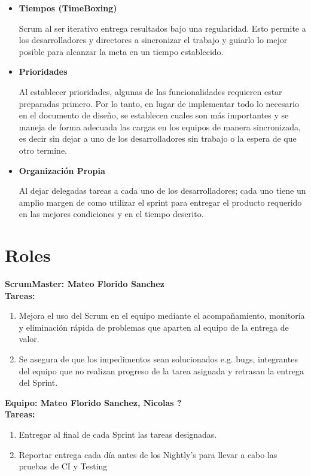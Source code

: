 \documentclass[letterpaper]{scrreprt}
\begin{document}
\begin{itemize}

	\item \textbf{Tiempos (TimeBoxing)}

	 Scrum al ser iterativo entrega resultados bajo una regularidad. Esto permite a los desarrolladores y directores a sincronizar el trabajo y guiarlo lo mejor posible para alcanzar la meta en un tiempo establecido.

	\item \textbf{Prioridades}

	Al establecer prioridades, algunas de las funcionalidades requieren estar preparadas primero. Por lo tanto, en lugar de implementar todo lo necesario en el documento de diseño, se establecen cuales son más importantes y se maneja de forma adecuada las cargas en los equipos de manera sincronizada, es decir sin dejar a uno de los desarrolladores sin trabajo o la espera de que otro termine.

	\item \textbf{Organización Propia}

	Al dejar delegadas tareas a cada uno de los desarrolladores; cada uno tiene un amplio margen de como utilizar el sprint para entregar el producto requerido en las mejores condiciones y en el tiempo descrito.

\end{itemize}

\section{Roles}
\textbf{ScrumMaster: Mateo Florido Sanchez} \\
\textbf{Tareas:} 
\begin{enumerate}
	\item Mejora el uso del Scrum en el equipo mediante el acompañamiento, monitoría y eliminación rápida de problemas que aparten al equipo de la entrega de valor.
	\item Se asegura de que los impedimentos sean solucionados e.g. bugs, integrantes del equipo que no realizan progreso de la tarea asignada y retrasan la entrega del Sprint.
\end{enumerate}
\textbf{Equipo: Mateo Florido Sanchez, Nicolas ?} \\
\textbf{Tareas:} 
\begin{enumerate}
	\item Entregar al final de cada Sprint las tareas designadas. 
	\item Reportar entrega cada día antes de los Nightly's para llevar a cabo las pruebas de CI y Testing
\end{enumerate}
\end{document}
